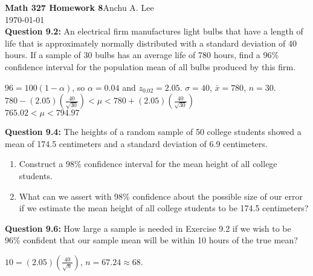 \documentclass{article}
\begin{document}
\noindent\textbf{Math 327 Homework 8}\hfill Anchu A. Lee\\
\noindent\today\\\newline
\textbf{Question 9.2:}
An electrical firm manufactures light bulbs that
have a length of life that is approximately normally
distributed with a standard deviation of 40 hours. If
a sample of 30 bulbs has an average life of 780 hours,
find a 96\% confidence interval for the population mean
of all bulbs produced by this firm.
\begin{description}
    \item $96 = 100(1-\alpha)$, so $\alpha = 0.04$ and 
    $z_{0.02}=2.05$. $\sigma = 40$, $\bar{x} = 780$, $n = 30$. \\
    $780 - (2.05)(\frac{40}{\sqrt{30}}) < \mu < 780 + (2.05)
    (\frac{40}{\sqrt{30}})$ \\ \boldmath$765.02 < \mu < 794.97$
\end{description}
\textbf{Question 9.4:}
The heights of a random sample of 50 college students 
showed a mean of 174.5 centimeters and a standard 
deviation of 6.9 centimeters.
\begin{enumerate}[label = (\alph*) ]
    \item Construct a 98\% confidence interval for the mean
    height of all college students.
    \item  What can we assert with 98\% confidence about the
    possible size of our error if we estimate the mean
    height of all college students to be 174.5 centimeters?
\end{enumerate}
\textbf{Question 9.6:}
How large a sample is needed in Exercise 9.2 if we
wish to be 96\% confident that our sample mean will be
within 10 hours of the true mean?
\begin{description}
    \item $10 = (2.05)(\frac{40}{\sqrt{n}})$, \boldmath$n = 67.24 \approx 68$.
\end{description}
\end{document}
